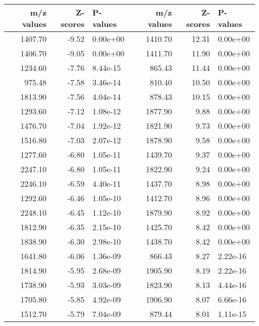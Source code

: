 \begin{table}[ht]
\centering
\begin{tabular}{rrlrrl}
  \hline
m/z values & Z-scores & P-values & m/z values & Z-scores & P-values \\ 
  \hline
1407.70 & -9.52 & 0.00e+00 & 1410.70 & 12.31 & 0.00e+00 \\ 
  1406.70 & -9.05 & 0.00e+00 & 1411.70 & 11.90 & 0.00e+00 \\ 
  1234.60 & -7.76 & 8.44e-15 & 865.43 & 11.44 & 0.00e+00 \\ 
  975.48 & -7.58 & 3.46e-14 & 810.40 & 10.50 & 0.00e+00 \\ 
  1813.90 & -7.56 & 4.04e-14 & 878.43 & 10.15 & 0.00e+00 \\ 
  1293.60 & -7.12 & 1.08e-12 & 1877.90 & 9.88 & 0.00e+00 \\ 
  1476.70 & -7.04 & 1.92e-12 & 1821.90 & 9.73 & 0.00e+00 \\ 
  1516.80 & -7.03 & 2.07e-12 & 1878.90 & 9.58 & 0.00e+00 \\ 
  1277.60 & -6.80 & 1.05e-11 & 1439.70 & 9.37 & 0.00e+00 \\ 
  2247.10 & -6.80 & 1.05e-11 & 1822.90 & 9.24 & 0.00e+00 \\ 
  2246.10 & -6.59 & 4.40e-11 & 1437.70 & 8.98 & 0.00e+00 \\ 
  1292.60 & -6.46 & 1.05e-10 & 1412.70 & 8.96 & 0.00e+00 \\ 
  2248.10 & -6.45 & 1.12e-10 & 1879.90 & 8.92 & 0.00e+00 \\ 
  1812.90 & -6.35 & 2.15e-10 & 1425.70 & 8.42 & 0.00e+00 \\ 
  1838.90 & -6.30 & 2.98e-10 & 1438.70 & 8.42 & 0.00e+00 \\ 
  1641.80 & -6.06 & 1.36e-09 & 866.43 & 8.27 & 2.22e-16 \\ 
  1814.90 & -5.95 & 2.68e-09 & 1905.90 & 8.19 & 2.22e-16 \\ 
  1738.90 & -5.93 & 3.03e-09 & 1823.90 & 8.13 & 4.44e-16 \\ 
  1705.80 & -5.85 & 4.92e-09 & 1906.90 & 8.07 & 6.66e-16 \\ 
  1512.70 & -5.79 & 7.04e-09 & 879.44 & 8.01 & 1.11e-15 \\ 
   \hline
\end{tabular}
\end{table}
